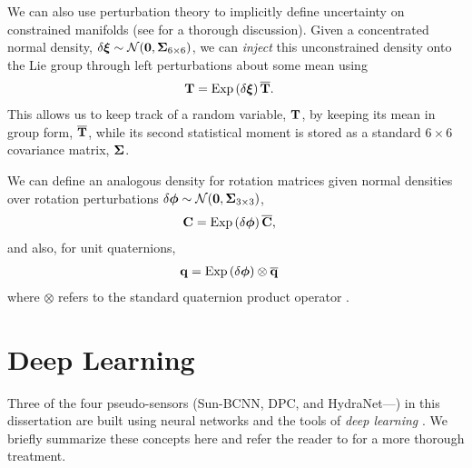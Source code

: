 We can also use perturbation theory to implicitly define uncertainty on constrained manifolds (see \cite{Barfoot2014-ac} for a thorough discussion). Given a concentrated normal density, $\delta \boldsymbol{\mathbf{\xi}} \sim \mathcal{N}{}(\boldsymbol{\mathbf{0}}, \boldsymbol{\mathbf{\Sigma}}_{6 \times 6})$, we can \textit{inject} this unconstrained density onto the Lie group through left perturbations about some mean using
\begin{align}
\boldsymbol{\mathbf{T}} &= \mathrm{Exp}\left({\delta \boldsymbol{\mathbf{\xi}}}\right) \overline{\boldsymbol{\mathbf{T}}}. 
\end{align}
This allows us to keep track of a random variable, $\boldsymbol{\mathbf{T}}$, by keeping its mean in group form, $\overline{\boldsymbol{\mathbf{T}}}$, while its second statistical moment is stored as a standard $6 \times 6$ covariance matrix, $\boldsymbol{\mathbf{\Sigma}}$.

We can define an analogous density for rotation matrices given normal densities over rotation perturbations $\delta \boldsymbol{\mathbf{\phi}} \sim \mathcal{N}{}(\boldsymbol{\mathbf{0}}, \boldsymbol{\mathbf{\Sigma}}_{3 \times 3})$,
\begin{align}
\boldsymbol{\mathbf{C}} &= \mathrm{Exp}\left({\delta \boldsymbol{\mathbf{\phi}}}\right) \overline{\boldsymbol{\mathbf{C}}}, 
\end{align}
and also, for unit quaternions,
\begin{align}
\boldsymbol{\mathbf{q}} &= \mathrm{Exp}\left({\delta \boldsymbol{\mathbf{\phi}}}\right) \otimes \overline{\boldsymbol{\mathbf{q}}} 
\end{align}
where $\otimes$ refers to the standard quaternion product operator \cite{Sola2017quaternion}. %


\section{Deep Learning}
Three of the four pseudo-sensors (Sun-BCNN, DPC, and HydraNet---) in this dissertation are built using neural networks and the tools of \textit{deep learning} \citep{LeCun2015-qf}. We briefly summarize these concepts here and refer the reader to \cite{Goodfellow-et-al-2016} for a more thorough treatment.
